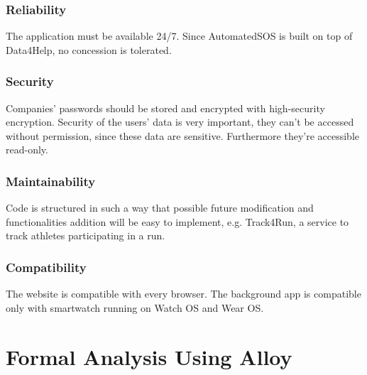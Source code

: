 \documentclass{article}
\begin{document}
\subsubsection{Reliability}
The application must be available 24/7. Since AutomatedSOS is built on top of Data4Help, no concession is tolerated.
\subsubsection{Security}
Companies' passwords should be stored and encrypted with high-security encryption. Security of the users' data is very important, they can't be accessed without permission, since these data are sensitive. Furthermore they're accessible read-only.
\subsubsection{Maintainability}
Code is structured in such a way that possible future modification and functionalities addition will be easy to implement, e.g. Track4Run, a service to track athletes participating in a run.
\subsubsection{Compatibility}
The website is compatible with every browser. The background app is compatible only with smartwatch running on Watch OS and Wear OS.
\newpage
\section{Formal Analysis Using Alloy}
\end{document}

